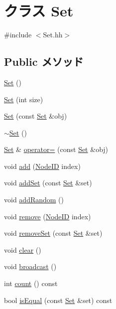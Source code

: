 \hypertarget{classSet}{
\section{クラス Set}
\label{classSet}
}


{\ttfamily \#include $<$Set.hh$>$}\subsection*{Public メソッド}
\begin{DoxyCompactItemize}
\item 
\hyperlink{classSet_ad2293f668ddb9a9fc99f78a737f6e86e}{Set} ()
\item 
\hyperlink{classSet_a4002084bb3b696e4d7208803d6778140}{Set} (int size)
\item 
\hyperlink{classSet_a730402671835f0f3385ca4d591f03bbe}{Set} (const \hyperlink{classSet}{Set} \&obj)
\item 
\hyperlink{classSet_a64c23991280aa719d76b8995d530115f}{$\sim$Set} ()
\item 
\hyperlink{classSet}{Set} \& \hyperlink{classSet_a274b72d7f852e6eb0e416c1d2e00c1ee}{operator=} (const \hyperlink{classSet}{Set} \&obj)
\item 
void \hyperlink{classSet_a9d3c0a08ea232cfc4e207b1bc39d43c9}{add} (\hyperlink{TypeDefines_8hh_a83c14b4ae37e80071f6b3506a6c46151}{NodeID} index)
\item 
void \hyperlink{classSet_a0412c72301eb345aceb1b0c2c38dd26a}{addSet} (const \hyperlink{classSet}{Set} \&set)
\item 
void \hyperlink{classSet_abd48774eca8e19eb2371c41bdf73c93c}{addRandom} ()
\item 
void \hyperlink{classSet_a1c1436bbfbdadb662db0fa20bfd8cc8b}{remove} (\hyperlink{TypeDefines_8hh_a83c14b4ae37e80071f6b3506a6c46151}{NodeID} index)
\item 
void \hyperlink{classSet_ab66a463aa908331ff43ccb847213b07c}{removeSet} (const \hyperlink{classSet}{Set} \&set)
\item 
void \hyperlink{classSet_ac8bb3912a3ce86b15842e79d0b421204}{clear} ()
\item 
void \hyperlink{classSet_a299d89c50484c4d3a597f6b43b65e21c}{broadcast} ()
\item 
int \hyperlink{classSet_a0745638c9967e2ed90bc96c012288c55}{count} () const 
\item 
bool \hyperlink{classSet_ad6a92fc7477f163a8730441d3597f5e1}{isEqual} (const \hyperlink{classSet}{Set} \&set) const 
\item 

\end{DoxyCompactItemize}
